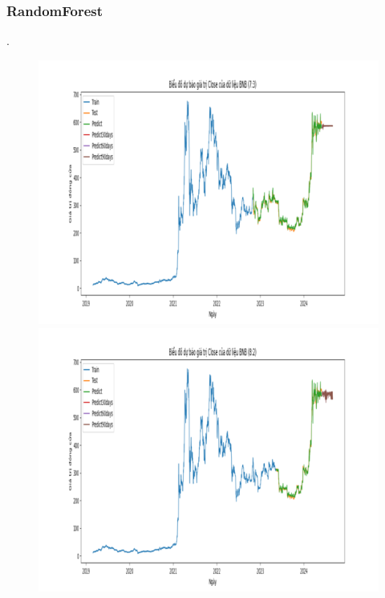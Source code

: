 \documentclass[conference]{IEEEtran}
\begin{document}
\subsubsection{RandomForest}.
\begin{figure}[H]
    \centering
    \begin{minipage}{0.15\textwidth}
    \centering
    \includegraphics[width=1\textwidth]{Figure/RandomForest_BNB_73.png}
    \end{minipage}
    \hfill
    \begin{minipage}{0.15\textwidth}
    \centering
    \includegraphics[width=1\textwidth]{Figure/RandomForest_BNB_82.png}
    \end{minipage}

\end{figure}
\end{document}
